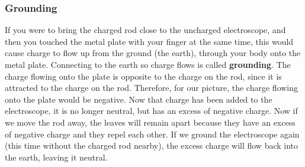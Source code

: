 \subsubsection{Grounding}
If you were to bring the charged rod close to the uncharged electroscope, and then you touched the metal plate with your finger at the same time, this would cause charge to flow up from the ground (the earth), through your body onto the metal plate. Connecting to the earth so charge flows is called \textbf{grounding}. The charge flowing onto the plate is opposite to the charge on the rod, since it is attracted to the charge on the rod. Therefore, for our picture, the charge flowing onto the plate would be negative. Now that charge has been added to the electroscope, it is no longer neutral, but has an excess of negative charge. Now if we move the rod away, the leaves will remain apart because they have an excess of negative charge and they repel each other. If we ground the electroscope again (this time without the charged rod nearby), the excess charge will flow back into the earth, leaving it neutral.

